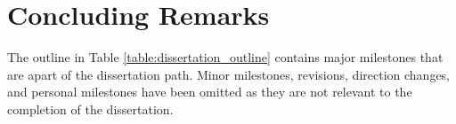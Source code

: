 \section{Concluding Remarks}
\label{proposal:conclusion}

The outline in Table \ref{table:dissertation_outline} contains major milestones that are apart of the dissertation path. Minor milestones, revisions, direction changes, and personal milestones have been omitted as they are not relevant to the completion of the dissertation.